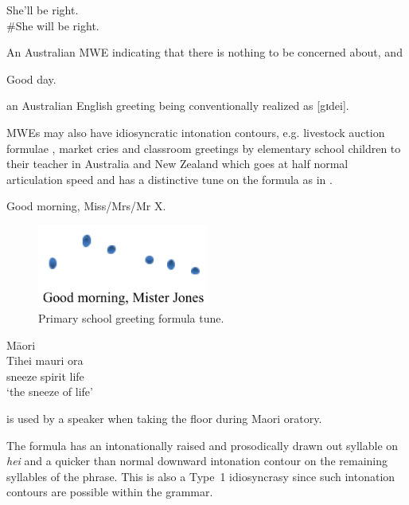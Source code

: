 \documentclass[output=paper]{langsci/langscibook}
\begin{document}
\begin{exe}
\ex\label{ex:ex05} She’ll be right.\\
	\#She will be right.
\end{exe}

\noindent
An Australian MWE indicating that there is nothing to be concerned about, and

\begin{exe}
\ex\label{ex:ex06} Good day.
\end{exe}

\noindent
an Australian English greeting being conventionally realized as [gɪdei]. 

MWEs may also have  idiosyncratic intonation contours, e.g. livestock auction formulae \citep{Kuiper1984}, market cries and classroom greetings by elementary school children to their teacher in Australia and New Zealand which goes at half normal articulation speed and has a distinctive tune on the formula as in . 


\begin{exe}
\ex\label{ex:ex07} Good morning, Miss/Mrs/Mr X. 
\end{exe}

\begin{figure}[h]
\includegraphics[width=0.5\textwidth]{figures/kuiper2_big.png}
\caption{Primary school greeting formula tune.}
\label{fig:05:02}
\end{figure}


\ea\label{ex:ex08}
M\=aori\\
\gll Tihei   mauri ora\\
  sneeze spirit  life\\
\glt ‘the sneeze of life’
\z


 is used by a speaker when taking the floor during Maori oratory.

The formula has an intonationally raised and prosodically drawn out syllable on \textit{hei} and a quicker than normal downward intonation contour on the remaining syllables of the phrase. This is also a Type~1 idiosyncrasy since such intonation contours are possible within the grammar. 
\end{document}
